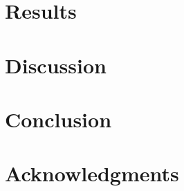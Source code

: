 \section{Results}



\section{Discussion}\label{sec:Discussion}



\glsresetall
\section{Conclusion}
\label{sec:Conclusion}


\section{Acknowledgments}



\newpage
\begin{table}[!t]
    \begin{framed}
        \vspace{-0.35in}
        \footnotesize
        \glsaddall
        \printglossary[
            style=mcolindex,
            nonumberlist,
            title=Nomenclature,
            nopostdot,
            nogroupskip,
        ]
    \end{framed}
\end{table}



%



 \appendix
 \section{} %



